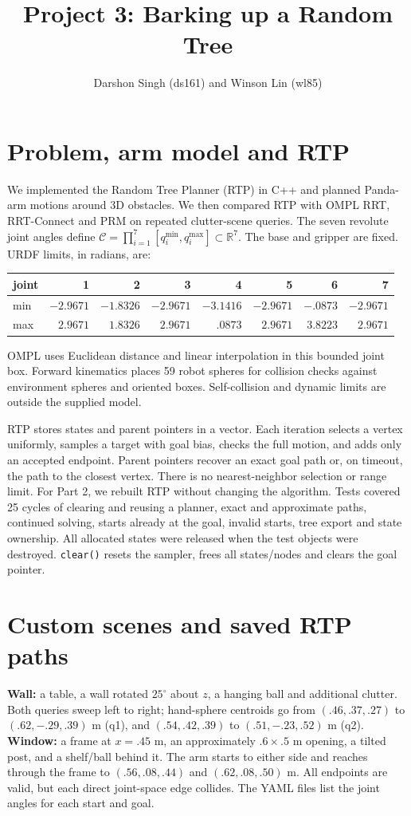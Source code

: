 \documentclass{comp450}
\title{Project 3: Barking up a Random Tree}
\author{Darshon Singh (ds161) and Winson Lin (wl85)}
\begin{document}
\maketitle
\fontsize{10}{11.8}\selectfont
\section*{Problem, arm model and RTP}
We implemented the Random Tree Planner (RTP) in C++ and planned Panda-arm motions around 3D obstacles. We then compared RTP with OMPL RRT, RRT-Connect and PRM on repeated clutter-scene queries. The seven revolute joint angles define $\mathcal C=\prod_{i=1}^7[q_i^{\min},q_i^{\max}]\subset\mathbb R^7$. The base and gripper are fixed. URDF limits, in radians, are:
\begin{center}\small
\begin{tabular}{lrrrrrrr}\toprule
joint & 1&2&3&4&5&6&7\\\midrule
min &$-2.9671$&$-1.8326$&$-2.9671$&$-3.1416$&$-2.9671$&$-.0873$&$-2.9671$\\
max &$2.9671$&$1.8326$&$2.9671$&$.0873$&$2.9671$&$3.8223$&$2.9671$\\\bottomrule
\end{tabular}\end{center}
OMPL uses Euclidean distance and linear interpolation in this bounded joint box. Forward kinematics places 59 robot spheres for collision checks against environment spheres and oriented boxes. Self-collision and dynamic limits are outside the supplied model.

RTP stores states and parent pointers in a vector. Each iteration selects a vertex uniformly, samples a target with goal bias, checks the full motion, and adds only an accepted endpoint. Parent pointers recover an exact goal path or, on timeout, the path to the closest vertex. There is no nearest-neighbor selection or range limit. For Part 2, we rebuilt RTP without changing the algorithm. Tests covered 25 cycles of clearing and reusing a planner, exact and approximate paths, continued solving, starts already at the goal, invalid starts, tree export and state ownership. All allocated states were released when the test objects were destroyed. \texttt{clear()} resets the sampler, frees all states/nodes and clears the goal pointer.

\section*{Custom scenes and saved RTP paths}
\textbf{Wall:} a table, a wall rotated $25^\circ$ about $z$, a hanging ball and additional clutter. Both queries sweep left to right; hand-sphere centroids go from $(.46,.37,.27)$ to $(.62,-.29,.39)$ m (q1), and $(.54,.42,.39)$ to $(.51,-.23,.52)$ m (q2). \textbf{Window:} a frame at $x=.45$ m, an approximately $.6\times.5$ m opening, a tilted post, and a shelf/ball behind it. The arm starts to either side and reaches through the frame to $(.56,.08,.44)$ and $(.62,.08,.50)$ m. All endpoints are valid, but each direct joint-space edge collides. The YAML files list the joint angles for each start and goal.
\end{document}
